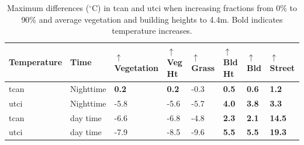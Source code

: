 \documentclass[final,3p,times,authoryear]{elsarticle}
\begin{document}
\begin{table}
\begin{tabular}{l l l l l l l l }
\hline
Temperature & Time & $\uparrow$ Vegetation & $\uparrow$ Veg Ht & $\uparrow$ Grass & $\uparrow$ Bld Ht & $\uparrow$ Bld & $\uparrow$ Street \\
\hline
\gls{tcan} & Nighttime &   
\textbf{0.2}&         %
\textbf{0.2}&         %
-0.3& %
\textbf{0.5}& %
\textbf{0.6}&            %
\textbf{1.2}\\           %
\gls{utci} & Nighttime &   
-5.8&         %
-5.6&         %
-5.7&   %
\textbf{4.0}&   %
\textbf{3.8}&         %
\textbf{3.3}\\%
\gls{tcan} & day time &
-6.6&     %
-6.8&     %
-4.8&           %
\textbf{2.3}&           %
\textbf{2.1}&     %
\textbf{14.5}\\%
\gls{utci} & day time &	
-7.9&           %
-8.5&           %
-9.6&   %
\textbf{5.5}&  %
\textbf{5.5}&           %
\textbf{19.3}\\%
\end{tabular}
\caption{\label{tab:tempDiffs}Maximum differences ($^{\circ}$C) in \gls{tcan} and \gls{utci} when increasing fractions from 0\% to 90\% and average vegetation and building heights to 4.4m. Bold indicates temperature increases.}
\end{table}





\end{document}
